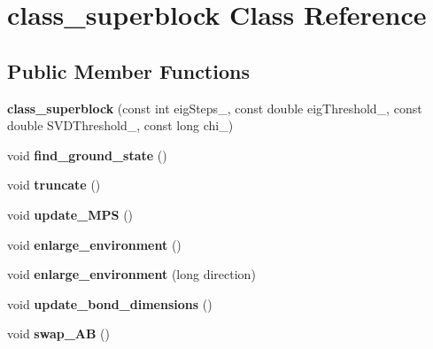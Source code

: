 \hypertarget{classclass__superblock}{}\section{class\+\_\+superblock Class Reference}
\label{classclass__superblock}
\subsection*{Public Member Functions}
\begin{DoxyCompactItemize}
\item 
{\bfseries class\+\_\+superblock} (const int eig\+Steps\+\_\+, const double eig\+Threshold\+\_\+, const double S\+V\+D\+Threshold\+\_\+, const long chi\+\_\+)\hypertarget{classclass__superblock_ad9f7d234331b24a9b7bbf595d3bb6457}{}\label{classclass__superblock_ad9f7d234331b24a9b7bbf595d3bb6457}

\item 
void {\bfseries find\+\_\+ground\+\_\+state} ()\hypertarget{classclass__superblock_ac1e7d8c6247b6fc5eaed7aebaf6cb88d}{}\label{classclass__superblock_ac1e7d8c6247b6fc5eaed7aebaf6cb88d}

\item 
void {\bfseries truncate} ()\hypertarget{classclass__superblock_a2d4d1b66835990d67ad77a458b802ca5}{}\label{classclass__superblock_a2d4d1b66835990d67ad77a458b802ca5}

\item 
void {\bfseries update\+\_\+\+M\+PS} ()\hypertarget{classclass__superblock_ae8df112baac53bd9ede08bc766b26fd5}{}\label{classclass__superblock_ae8df112baac53bd9ede08bc766b26fd5}

\item 
void {\bfseries enlarge\+\_\+environment} ()\hypertarget{classclass__superblock_a2d1a7392a8f9a56c0a2d7252dda2eaec}{}\label{classclass__superblock_a2d1a7392a8f9a56c0a2d7252dda2eaec}

\item 
void {\bfseries enlarge\+\_\+environment} (long direction)\hypertarget{classclass__superblock_a98cea6c49aefdf032f07081cce425ea8}{}\label{classclass__superblock_a98cea6c49aefdf032f07081cce425ea8}

\item 
void {\bfseries update\+\_\+bond\+\_\+dimensions} ()\hypertarget{classclass__superblock_abe0ca58bd3b1ba7ee12e8b3a617c2759}{}\label{classclass__superblock_abe0ca58bd3b1ba7ee12e8b3a617c2759}

\item 
void {\bfseries swap\+\_\+\+AB} ()\hypertarget{classclass__superblock_a593c53eaa16bbb4dd67f4a9db95c821e}{}\label{classclass__superblock_a593c53eaa16bbb4dd67f4a9db95c821e}


\end{DoxyCompactItemize}
